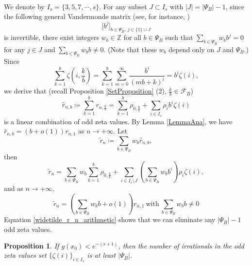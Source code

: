 \documentclass[11pt]{amsart}
\newtheorem{proposition}[theorem]{Proposition}
\numberwithin{equation}{section}
\begin{document}
We denote by $I_s = \{ 3,5,7,\cdots,s \}$. For any subset $J \subset I_s$ with $|J| = |\mathcal{\varPsi}_B| -1$, since the following general Vandermonde matrix (see, for instance, \cite[pp. 76-77]{GK02})
\[\big[b^{j}\big]_{b \in \mathcal{\varPsi}_B, \  j \in \{1\} \cup J }\]
is invertible, there exist integers $w_b \in \mathbb{Z}$ for all $b \in \mathcal{\varPsi}_B$ such that $\sum_{b \in \mathcal{\varPsi}_B} w_{b} b^{j} = 0$ for any $j \in J$ and $\sum_{b \in \mathcal{\varPsi}_B} w_{b} b \neq 0$. (Note that these $w_b$ depend only on $J$ and $\mathcal{\varPsi}_B$.) Since
\begin{equation}\label{Hurwitz_zeta_to_zeta}
\sum_{k=1}^{b} \zeta\left(i,\frac{k}{b}\right) = \sum_{k=1}^{b} \sum_{m=0}^{\infty} \frac{b^i}{(mb+k)^i} =  b^i \zeta(i),
\end{equation}
we derive that (recall Proposition \ref{SetProposition} (2), $\frac{k}{b} \in \mathcal{F}_B$)
\[\widehat{r}_{n,b} \coloneqq \sum_{k=1}^{b} r_{n,\frac{k}{b}} = \sum_{k=1}^{b} \rho_{0,\frac{k}{b}} + \sum_{i \in I_s} \rho_{i} b^i \zeta(i)\]
is a linear combination of odd zeta values. By Lemma \ref{LemmaAna}, we have $\widehat{r}_{n,b} = (b+o(1))r_{n,1}$  as  $n \rightarrow +\infty$. Let
\[\widetilde{r}_{n} \coloneqq \sum_{b \in \mathcal{\varPsi}_B} w_b \widehat{r}_{n,b},\]
then
\begin{equation}\label{widetilde_r_n_arithmetic}
\widetilde{r}_{n} = \sum_{b \in \mathcal{\varPsi}_B} w_b \sum_{k=1}^{b} \rho_{0,\frac{k}{b}} + \sum_{i \in I_s \setminus J} \left( \sum_{b \in \mathcal{\varPsi}_B} w_b b^i \right) \rho_{i} \zeta(i),
\end{equation}
and as $n \rightarrow +\infty$,
\begin{equation}\label{widetilde_r_n_analysis}
\widetilde{r}_{n} = \left( \sum_{b \in \mathcal{\varPsi}_B} w_{b} b + o(1)\right) r_{n,1} ~\text{with}~ \sum_{b \in \mathcal{\varPsi}_B} w_{b} b \neq 0
\end{equation}
Equation \eqref{widetilde_r_n_arithmetic} shows that we can eliminate any $|\mathcal{\varPsi}_B|-1$ odd zeta values.

\smallskip
\begin{proposition}\label{FinalProp}
If $g(x_0) < e^{-(s+1)}$, then the number of irrationals in the odd zeta values set $\{ \zeta(i) \}_{i \in I_s}$ is at least $|\mathcal{\varPsi}_B|$.
\end{proposition}
\end{document}
